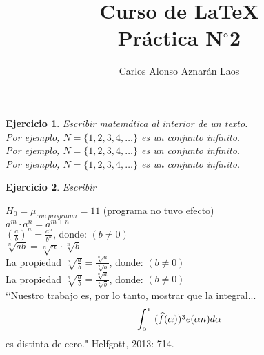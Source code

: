 \documentclass[12pt,a4paper]{article}
\author{Carlos Alonso Aznarán Laos}
\title{Curso de \LaTeX \\ Práctica  N$ ^{\circ}$2}
\newtheorem{ejer}{Ejercicio}%
\begin{document}
\maketitle %
\begin{ejer}
Escribir matemática al interior de un texto.\\
\noindent Por ejemplo, $N=\{1, 2, 3, 4, \ldots \}$ es un conjunto infinito.\\

Por ejemplo, \(N=\{1, 2, 3, 4, \ldots \}\) es un conjunto infinito.\\

Por ejemplo,  \begin{math}N=\{1, 2, 3, 4, \ldots \} \end{math} es un conjunto infinito.\\
\end{ejer}
\begin{ejer}
Escribir
\end{ejer}


$H_0 = \mu_{con\: programa}= 11$ (programa no tuvo efecto)\\

$a^{m}\cdot a^{n} = a^{m+n}$\\

$\left(\frac{a}{b}\right)^{n}=\frac{{a}^{n}} {{b}^{n}}$, donde: $(b\neq0)$\\

$\sqrt[n]{ab} = \sqrt[n]{a}\cdot \sqrt[n]{b}$\\

La propiedad $\sqrt[n]{\frac{a}{b}} = \frac{\sqrt[n]{a}}{\sqrt[n]{b}}$, donde: $(b\neq0)$\\
La propiedad $\displaystyle\sqrt[n]{\frac{a}{b}} = \frac{\sqrt[n]{a}}{\sqrt[n]{b}}$, donde: $(b\neq0)$\\

‘‘Nuestro trabajo es, por lo tanto, mostrar que la integral... \begin{displaymath} \mathnormal{\int_{0}^{1} \,\, (\widehat{f} (\alpha))^{3}e(\alpha n) d \alpha}
\end{displaymath} es distinta de cero." Helfgott, 2013: 714.
\end{document}
